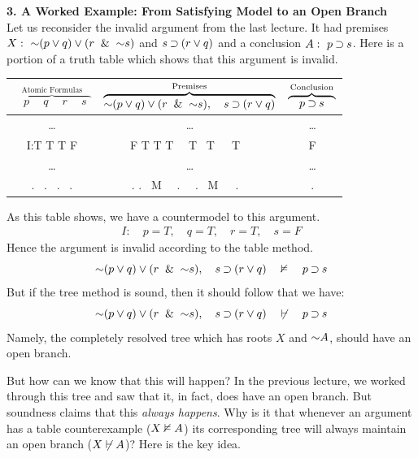 \documentclass[options]{philosophersimprint}
\begin{document}
\textbf{3. A Worked Example: From Satisfying Model to an Open Branch}\\ Let us reconsider the invalid argument from the last lecture. It had premises $X: \  \mathord{\sim}(p\mathbin{\vee} q) \mathbin{\vee} (r \ \mathbin{\&} \  \mathord{\sim} s)$ and $s \mathbin{\supset} (r \mathbin{\vee} q)$ and a conclusion $A: \ p \mathbin{\supset} s$. Here is a portion of a truth table which shows that this argument is invalid.
\begin{table}[h!]
            \centering
            \begin{tabular}{c | c | c }
                 $\overbrace{\quad p \ \quad q \ \quad r \ \quad s\ \ }^\text{Atomic Formulas}$ & $\overbrace{\mathord{\sim}(p\mathbin{\vee} q) \mathbin{\vee} (r \ \mathbin{\&} \  \mathord{\sim} s), \quad s \mathbin{\supset} (r \mathbin{\vee} q)}^\text{Premises}$ & $\overbrace{\quad p \mathbin{\supset} s\quad}^\text{Conclusion}$ \\
                 \hline
                 \dots & \dots & \dots\\
                 I:\quad T \quad T \quad T \quad F \quad & F \quad T \quad T \quad T \ \ T \qquad \ T\quad \ \ \ T \quad \ & F \\
                 \dots & \dots & \dots\\
             \quad $.$ \ \quad $.$ \ \quad $.$ \ \quad $.$ & $.$ \quad $.$ \quad \ M \quad \ \ $.$ \ \ $.$ \qquad \ M\quad \ \ \ $.$ \quad \  & $.$\\
            \end{tabular}
        \end{table}
As this table shows, we have a countermodel to this argument.
\begin{align}\label{EqEval}
I: \quad p=T, \quad q=T, \quad  r=T, \quad  s=F
\end{align}
Hence the argument is invalid according to the table method.
$$\mathord{\sim}(p\mathbin{\vee} q) \mathbin{\vee} (r \ \mathbin{\&} \  \mathord{\sim} s), \quad s \mathbin{\supset} (r \mathbin{\vee} q)\quad \nvDash \quad p \mathbin{\supset} s$$
But if the tree method is sound, then it should follow that we have:
$$\mathord{\sim}(p\mathbin{\vee} q) \mathbin{\vee} (r \ \mathbin{\&} \  \mathord{\sim} s), \quad s \mathbin{\supset} (r \mathbin{\vee} q)\quad \not\vdash \quad p \mathbin{\supset} s$$
Namely, the completely resolved tree which has roots $X$ and $\mathord{\sim} A$, should have an open branch.

But how can we know that this will happen? In the previous lecture, we worked through this tree and saw that it, in fact, does have an open branch. But soundness claims that this \textit{always happens}. Why is it that whenever an argument has a table counterexample ($X \nvDash A$) its corresponding tree will always maintain an open branch ($X \not\vdash A$)? Here is the key idea.
\end{document}
